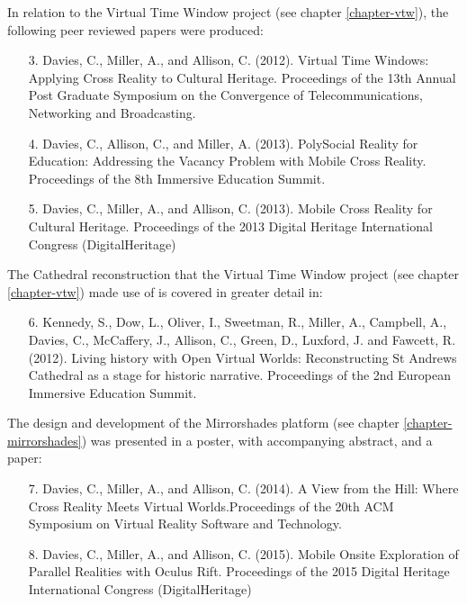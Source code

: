 
In relation to the Virtual Time Window project (see chapter \ref{chapter-vtw}), the following peer reviewed papers were produced:

\begin{itemize}

	\item [3.] Davies, C., Miller, A., and Allison, C. (2012). Virtual Time Windows: Applying Cross Reality to Cultural Heritage. Proceedings of the 13th Annual Post Graduate Symposium on the Convergence of Telecommunications, Networking and Broadcasting.
	
	\item [4.] Davies, C., Allison, C., and Miller, A. (2013). PolySocial Reality for Education: Addressing the Vacancy Problem with Mobile Cross Reality. Proceedings of the 8th Immersive Education Summit.

	\item [5.] Davies, C., Miller, A., and Allison, C. (2013). Mobile Cross Reality for Cultural Heritage. Proceedings of the 2013 Digital Heritage International Congress (DigitalHeritage)

\end{itemize}


The Cathedral reconstruction that the Virtual Time Window project (see chapter \ref{chapter-vtw}) made use of is covered in greater detail in:

\begin{itemize}

	\item [6.] Kennedy, S., Dow, L., Oliver, I., Sweetman, R., Miller, A., Campbell, A., Davies, C., McCaffery, J., Allison, C., Green, D., Luxford, J. and Fawcett, R. (2012). Living history with Open Virtual Worlds: Reconstructing St Andrews Cathedral as a stage for historic narrative. Proceedings of the 2nd European Immersive Education Summit.

\end{itemize}


The design and development of the Mirrorshades platform (see chapter \ref{chapter-mirrorshades}) was presented in a poster, with accompanying abstract, and a paper:

\begin{itemize}
	\item [7.] Davies, C., Miller, A., and Allison, C. (2014). A View from the Hill: Where Cross Reality Meets Virtual Worlds.Proceedings of the 20th ACM Symposium on Virtual Reality Software and Technology.

	\item [8.] Davies, C., Miller, A., and Allison, C. (2015). Mobile Onsite Exploration of Parallel Realities with Oculus Rift. Proceedings of the 2015 Digital Heritage International Congress (DigitalHeritage)
	
\end{itemize}

